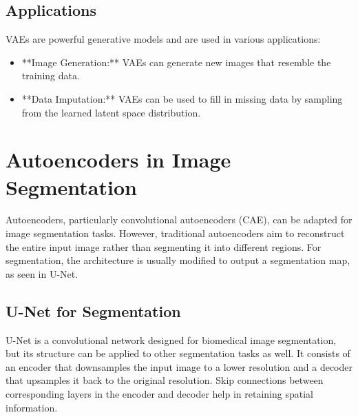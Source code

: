 \documentclass{article}
\begin{document}
\subsection{Applications}

VAEs are powerful generative models and are used in various applications:

\begin{itemize}
    \item **Image Generation:** VAEs can generate new images that resemble the training data.
    \item **Data Imputation:** VAEs can be used to fill in missing data by sampling from the learned latent space distribution.
\end{itemize}

\section{Autoencoders in Image Segmentation}

Autoencoders, particularly convolutional autoencoders (CAE), can be adapted for image segmentation tasks. However, traditional autoencoders aim to reconstruct the entire input image rather than segmenting it into different regions. For segmentation, the architecture is usually modified to output a segmentation map, as seen in U-Net.

\subsection{U-Net for Segmentation}

U-Net is a convolutional network designed for biomedical image segmentation, but its structure can be applied to other segmentation tasks as well. It consists of an encoder that downsamples the input image to a lower resolution and a decoder that upsamples it back to the original resolution. Skip connections between corresponding layers in the encoder and decoder help in retaining spatial information.
\end{document}
